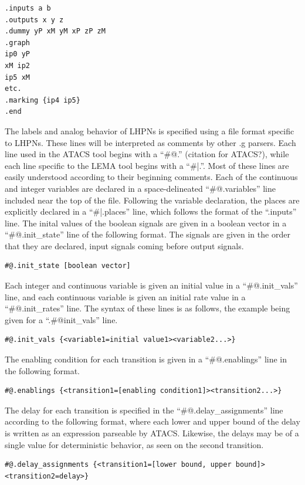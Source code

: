 \documentclass[titlepage,11pt]{article}
\begin{document}
\begin{verbatim}
.inputs a b
.outputs x y z
.dummy yP xM yM xP zP zM
.graph
ip0 yP
xM ip2
ip5 xM
etc.
.marking {ip4 ip5}
.end
\end{verbatim}

The labels and analog behavior of LHPNs is specified using a file format 
specific to LHPNs.  These lines will be interpreted as comments by other .g
parsers.  Each line used in the ATACS tool begins with a ``\#@.'' (citation for
ATACS?), while each line specific to the LEMA tool begins with a ``\#|.''.
Most of these lines are easily understood according to their beginning comments.
Each of the continuous and integer variables are declared in a space-delineated
``\#@.variables'' line included near the top of the file.  Following the 
variable declaration, the places are explicitly declared in a ``\#|.places'' 
line, which follows the format of the ``.inputs'' line.  The inital values of
the boolean signals are given in a boolean vector in a ``\#@.init\_state'' line
of the following format.  The signals are given in the order that they are
declared, input signals coming before output signals.

\begin{verbatim}
#@.init_state [boolean vector]
\end{verbatim}

\noindent
Each integer and continuous variable is given an initial value in a
``\#@.init\_vals'' line, and each continuous variable is given an initial rate
value in a ``\#@.init\_rates'' line.  The syntax of these lines is as follows,
the example being given for a ``.\#@init\_vals'' line.

\begin{verbatim}
#@.init_vals {<variable1=initial value1><variable2...>}
\end{verbatim}

The enabling condition for each transition is given in a ``\#@.enablings'' line
in the following format.

\begin {verbatim}
#@.enablings {<transition1=[enabling condition1]><transition2...>}
\end {verbatim}

The delay for each transition is specified in the ``\#@.delay\_assignments'' 
line according to the following format, where each lower and upper bound of the
delay is written as an expression parseable by ATACS.  Likewise, the delays may
be of a single value for deterministic behavior, as seen on the second 
transition.

\begin{verbatim}
#@.delay_assignments {<transition1=[lower bound, upper bound]><transition2=delay>}
\end{verbatim}
\end{document}
